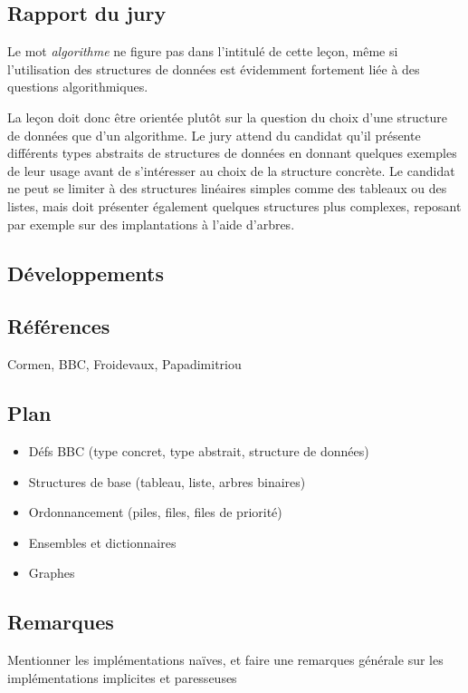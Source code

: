 \documentclass[../../agregation.tex]{subfiles}
\begin{document}

\subsection{Rapport du jury}

\begin{aquote}{}
Le mot \emph{algorithme} ne figure pas dans l'intitulé de cette leçon, même si l'utilisation des structures de données est évidemment fortement liée à des questions algorithmiques.

La leçon doit donc être orientée plutôt sur la question du choix d'une structure de données que d'un algorithme. Le jury attend du candidat qu'il présente différents types abstraits de structures de données en donnant quelques exemples de leur usage avant de s'intéresser au choix de la structure concrète. Le candidat ne peut se limiter à des structures linéaires simples comme des tableaux ou des listes, mais doit présenter également quelques structures plus complexes, reposant par exemple sur des implantations à l'aide d'arbres.
\end{aquote}

\subsection{Développements}

\dvts

\subsection{Références}

Cormen, BBC, Froidevaux, Papadimitriou

\subsection{Plan}

\begin{itemize}
	\item Défs BBC (type concret, type abstrait, structure de données)
	\item Structures de base (tableau, liste, arbres binaires)
	\item Ordonnancement (piles, files, files de priorité)
	\item Ensembles et dictionnaires
	\item Graphes
\end{itemize}

\subsection{Remarques}

Mentionner les implémentations naïves, et faire une remarques générale sur les implémentations implicites et paresseuses
\end{document}
